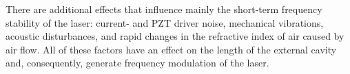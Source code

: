 There are additional effects that influence mainly the short-term frequency stability of the laser: current- and PZT driver noise, mechanical vibrations, acoustic disturbances, and rapid changes in the refractive index of air caused by air flow. All of these factors have an effect on the length of the external cavity and, consequently, generate frequency modulation of the laser.